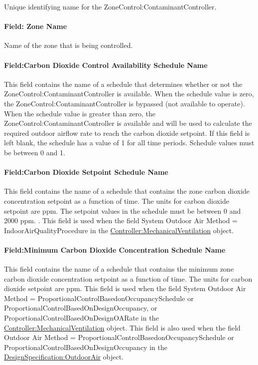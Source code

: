 Unique identifying name for the ZoneControl:ContaminantController.

\paragraph{Field: Zone Name}\label{field-controlled-zone-name-000}

Name of the zone that is being controlled.

\paragraph{Field:Carbon Dioxide Control Availability Schedule Name}\label{fieldcarbon-dioxide-control-availability-schedule-name}

This field contains the name of a schedule that determines whether or not the ZoneControl:ContaminantController is available. When the schedule value is zero, the ZoneControl:ContaminantController is bypassed (not available to operate). When the schedule value is greater than zero, the ZoneControl:ContaminantController is available and will be used to calculate the required outdoor airflow rate to reach the carbon dioxide setpoint. If this field is left blank, the schedule has a value of 1 for all time periods. Schedule values must be between 0 and 1.

\paragraph{Field:Carbon Dioxide Setpoint Schedule Name}\label{fieldcarbon-dioxide-setpoint-schedule-name}

This field contains the name of a schedule that contains the zone carbon dioxide concentration setpoint as a function of time. The units for carbon dioxide setpoint are ppm. The setpoint values in the schedule must be between 0 and 2000 ppm. . This field is used when the field System Outdoor Air Method = IndoorAirQualityProcedure in the \hyperref[controllermechanicalventilation]{Controller:MechanicalVentilation} object.

\paragraph{Field:Minimum Carbon Dioxide Concentration Schedule Name}\label{fieldminimum-carbon-dioxide-concentration-schedule-name}

This field contains the name of a schedule that contains the minimum zone carbon dioxide concentration setpoint as a function of time. The units for carbon dioxide setpoint are ppm. This field is used when the field System Outdoor Air Method = ProportionalControlBasedonOccupancySchedule or ProportionalControlBasedOnDesignOccupancy, or ProportionalControlBasedOnDesignOARate in the \hyperref[controllermechanicalventilation]{Controller:MechanicalVentilation} object. This field is also used when the field Outdoor Air Method = ProportionalControlBasedonOccupancySchedule or ProportionalControlBasedOnDesignOccupancy in the \hyperref[designspecificationoutdoorair]{DesignSpecification:OutdoorAir} object.

